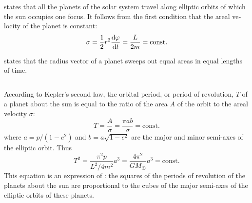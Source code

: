  states that all the planets of the solar system travel along elliptic orbits of which the sun occupies one focus. It follows from the first condition  that the areal ve­locity  of the planet is constant:
\begin{equation*}%
\sigma = \frac{1}{2} r^{2} \dv{\varphi}{t} = \frac{L}{2m} =\textrm{const.}
\end{equation*}


 states that the radius vector of a planet sweeps out equal areas in equal lengths of time.

\subsection{}\label{6.3.3} According to Kepler's second law, the orbital period, or period of revolution, $T$ of a planet about the sun is equal to the ratio of the area $A$ of the orbit to the areal velocity $\sigma$:
\begin{equation*}%
T=\frac{A}{\sigma} = \frac{\pi ab}{\sigma} =\textrm{const.}
\end{equation*}
where $a = p/(1 - e^{2})$ and $b = a \sqrt{ 1 - e^{2}}$ are the major and minor semi-axes of the elliptic orbit. Thus
\begin{equation*}%
T^{2}=\frac{\pi^{2}p}{L^{2}/4m^{2}}a^{3} = \frac{4 \pi^{2}}{GM_{\Sun}} a^{3}=\textrm{const.}
\end{equation*}
This equation is an expression of : the squares of the periods of revolution of the planets about the sun are proportional to the cubes of the major semi-axes of the elliptic orbits of these planets.


